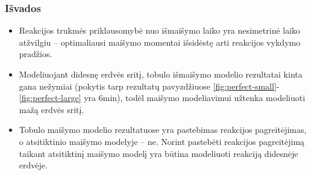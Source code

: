 \documentclass{beamer}
\begin{document}
\begin{frame}
\frametitle{Išvados}
\begin{itemize}
      
  \item Reakcijos trukmės priklausomybė nuo išmaišymo laiko yra nesimetrinė laiko atžvilgiu -- optimaliausi maišymo momentai išsidėstę arti reakcijos vykdymo pradžios.

  \item Modeliuojant didesnę erdvės sritį, tobulo išmaišymo modelio rezultatai kinta gana nežymiai (pokytis tarp rezultatų pavyzdžiuose \ref{fig:perfect-small}-\ref{fig:perfect-large} yra 6min), todėl maišymo modeliavimui užtenka modeliuoti mažą  erdvės sritį.

  \item Tobulo maišymo modelio rezultatuose yra pastebimas reakcijos pagreitėjimas, o atsitiktinio maišymo modelyje -- ne. Norint pastebėti reakcijos pagreitėjimą taikant atsitiktinį maišymo modelį yra būtina modeliuoti reakciją didesnėje erdvėje.
  

\end{itemize}
\end{frame}

\end{document}
